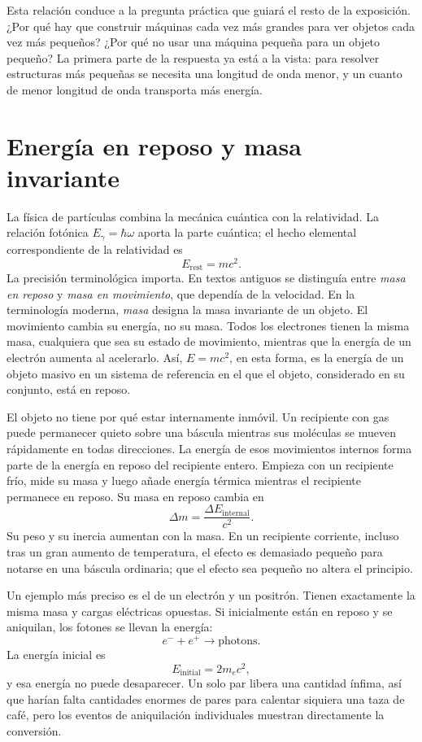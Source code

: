 Esta relación conduce a la pregunta práctica que guiará el resto de la exposición. ¿Por qué hay que construir máquinas cada vez más grandes para ver objetos cada vez más pequeños? ¿Por qué no usar una máquina pequeña para un objeto pequeño? La primera parte de la respuesta ya está a la vista: para resolver estructuras más pequeñas se necesita una longitud de onda menor, y un cuanto de menor longitud de onda transporta más energía.

\section{Energía en reposo y masa invariante}

La física de partículas combina la mecánica cuántica con la relatividad. La relación fotónica \(E_\gamma=\hbar\omega\) aporta la parte cuántica; el hecho elemental correspondiente de la relatividad es
\begin{equation}
E_{\mathrm{rest}}=mc^2.
\end{equation}
La precisión terminológica importa. En textos antiguos se distinguía entre \emph{masa en reposo} y \emph{masa en movimiento}, que dependía de la velocidad. En la terminología moderna, \emph{masa} designa la masa invariante de un objeto. El movimiento cambia su energía, no su masa. Todos los electrones tienen la misma masa, cualquiera que sea su estado de movimiento, mientras que la energía de un electrón aumenta al acelerarlo. Así, \(E=mc^2\), en esta forma, es la energía de un objeto masivo en un sistema de referencia en el que el objeto, considerado en su conjunto, está en reposo.

El objeto no tiene por qué estar internamente inmóvil. Un recipiente con gas puede permanecer quieto sobre una báscula mientras sus moléculas se mueven rápidamente en todas direcciones. La energía de esos movimientos internos forma parte de la energía en reposo del recipiente entero. Empieza con un recipiente frío, mide su masa y luego añade energía térmica mientras el recipiente permanece en reposo. Su masa en reposo cambia en
\begin{equation}
\Delta m=\frac{\Delta E_{\mathrm{internal}}}{c^2}.
\end{equation}
Su peso y su inercia aumentan con la masa. En un recipiente corriente, incluso tras un gran aumento de temperatura, el efecto es demasiado pequeño para notarse en una báscula ordinaria; que el efecto sea pequeño no altera el principio.

Un ejemplo más preciso es el de un electrón y un positrón. Tienen exactamente la misma masa y cargas eléctricas opuestas. Si inicialmente están en reposo y se aniquilan, los fotones se llevan la energía:
\begin{equation}
e^-+e^+\longrightarrow \text{photons}.
\end{equation}
La energía inicial es
\begin{equation}
E_{\mathrm{initial}}=2m_e c^2,
\end{equation}
y esa energía no puede desaparecer. Un solo par libera una cantidad ínfima, así que harían falta cantidades enormes de pares para calentar siquiera una taza de café, pero los eventos de aniquilación individuales muestran directamente la conversión.

